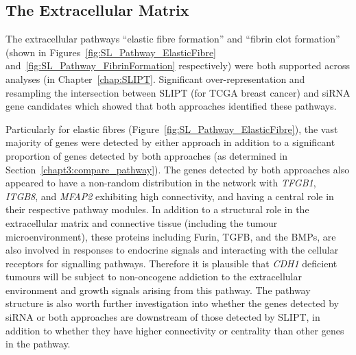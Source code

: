 \FloatBarrier


\subsection{The Extracellular Matrix}  \label{chapt4:SL_Genes_ECM}

The extracellular pathways ``elastic fibre formation'' and ``fibrin clot formation'' (shown in Figures~\ref{fig:SL_Pathway_ElasticFibre} and~\ref{fig:SL_Pathway_FibrinFormation} respectively) were both supported across analyses (in Chapter~\ref{chap:SLIPT}. Significant over-representation and resampling the intersection between \gls{SLIPT} (for TCGA breast cancer) and \gls{siRNA} gene candidates which showed that both approaches identified these pathways.

\begin{figure*}[!tb]
  \begin{center}
   }
   \end{center}
   \caption[Synthetic Lethality in the Elastic Fibre Formation Pathway]{\small \textbf{Synthetic Lethality in the Elastic Fibre Formation Pathway.} The Reactome Elastic Fibre Formation pathway with synthetic lethal candidates coloured as shown in the legend.
}
\label{fig:SL_Pathway_ElasticFibre}
\end{figure*}

Particularly for elastic fibres (Figure~\ref{fig:SL_Pathway_ElasticFibre}), the vast majority of genes were detected by either approach in addition to a significant proportion of genes detected by both approaches (as determined in Section~\ref{chapt3:compare_pathway}). The genes detected by both approaches also appeared to have a non-random distribution in the network with \textit{TFGB1}, \textit{ITGB8}, and \textit{MFAP2} exhibiting high connectivity, and having a central role in their respective pathway modules. In addition to a structural role in the extracellular matrix and connective tissue (including the tumour microenvironment), these proteins including Furin, \gls{TGFB}, and the \glspl{BMP}, are also involved in responses to endocrine signals and interacting with the cellular receptors for signalling pathways. Therefore it is plausible that \textit{CDH1} deficient tumours will be subject to non-oncogene addiction to the extracellular environment and growth signals arising from this pathway. The pathway structure is also worth further investigation into whether the genes detected by \gls{siRNA} or both approaches are downstream of those detected by \gls{SLIPT}, in addition to whether they have higher connectivity or centrality than other genes in the pathway.

